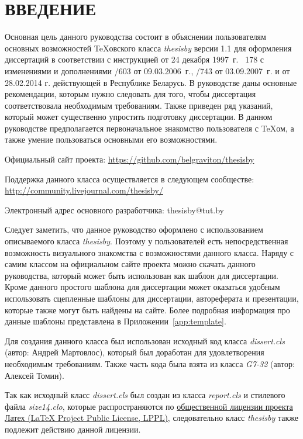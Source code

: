\chapter*{ВВЕДЕНИЕ}

Основная цель данного руководства состоит в объяснении пользователям основных
возможностей \TeX овского класса {\itshape thesisby} версии 1.1 для  оформления
диссертаций в соответствии с инструкцией  от 24 декабря 1997~г. \textnumero ~178 с
изменениями и дополнениями /603 от 09.03.2006~г., /743 от
03.09.2007~г. и  от 28.02.2014 г. действующей в Республике Беларусь. В руководстве даны основные рекомендации, которым нужно следовать для того, чтобы диссертация соответствовала необходимым требованиям. Также приведен ряд указаний, который может существенно упростить подготовку диссертации. В данном руководстве предполагается первоначальное знакомство пользователя с \TeX ом, а также умение пользоваться основными его возможностями.

Официальный сайт проекта:
\href{https://github.com/belgraviton/thesisby}{https://github.com/belgraviton/thesisby}

Поддержка данного класса осуществляется в следующем сообществе:
\href{http://community.livejournal.com/thesisby/}{
http://community.livejournal.com/thesisby/}

Электронный адрес основного разработчика: thesisby@tut.by

Следует заметить, что данное руководство оформлено с использованием описываемого класса {\itshape thesisby}. Поэтому у пользователей есть непосредственная возможность визуального знакомства с возможностями данного класса. Наряду с самим классом на официальном сайте проекта можно скачать  данного руководства, который может быть использован как шаблон для диссертации. Кроме данного простого шаблона для диссертации может оказаться удобным использовать сцепленные шаблоны для диссертации, автореферата и презентации, которые также могут быть найдены на сайте. Более подробная информация про данные шаблоны представлена в Приложении~\ref{app:template}.

Для создания данного класса был использован исходный код класса {\itshape
dissert.cls} (автор: Андрей Мартовлос), который был доработан для удовлетворения
необходимым требованиям. Также часть кода была взята из класса {\itshape G7-32}
(автор: Алексей Томин).

Так как исходный класс {\itshape dissert.cls} был создан из класса {\itshape report.cls} и  стилевого файла {\itshape size14.clo}, которые распространяются по \href{http://www.latex-project.org/lppl/}{общественной лицензии проекта Латех (LaTeX Project Public License, LPPL)}, следовательно класс {\itshape thesisby} также подлежит действию данной лицензии.

